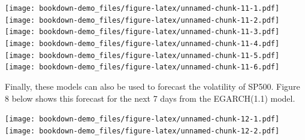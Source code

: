 \documentclass[]{book}
\theoremstyle{definition}
\theoremstyle{definition}
\theoremstyle{definition}
\theoremstyle{remark}
\begin{document}
\texttt{[image: bookdown-demo\_files/figure-latex/unnamed-chunk-11-1.pdf]}
\texttt{[image: bookdown-demo\_files/figure-latex/unnamed-chunk-11-2.pdf]}
\texttt{[image: bookdown-demo\_files/figure-latex/unnamed-chunk-11-3.pdf]}
\texttt{[image: bookdown-demo\_files/figure-latex/unnamed-chunk-11-4.pdf]}
\texttt{[image: bookdown-demo\_files/figure-latex/unnamed-chunk-11-5.pdf]}
\texttt{[image: bookdown-demo\_files/figure-latex/unnamed-chunk-11-6.pdf]}

Finally, these models can also be used to forecast the volatility of
SP500. Figure 8 below shows this forecast for the next 7 days from the
EGARCH(1.1) model.

\texttt{[image: bookdown-demo\_files/figure-latex/unnamed-chunk-12-1.pdf]}
\texttt{[image: bookdown-demo\_files/figure-latex/unnamed-chunk-12-2.pdf]}


\end{document}
